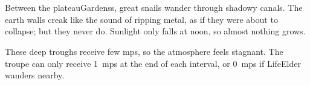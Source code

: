 \section{}
\label{shadepaths}

Between the \glspl{plateauGardens}, great snails wander through shadowy canals.
The earth walls creak like the sound of ripping metal, as if they were about to collapse; but they never do.
Sunlight only falls at noon, so almost nothing grows.

These deep troughs receive few \glspl{mp}, so the atmosphere feels stagnant.
The troupe can only receive 1~\glspl{mp} at the end of each \gls{interval}, or 0~\glspl{mp} if \gls{LifeElder} wanders nearby.




